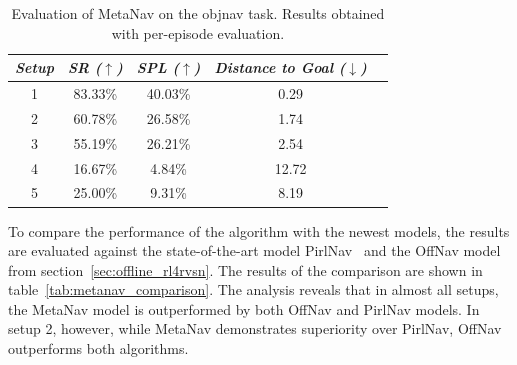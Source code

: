 \begin{table}
    \centering
    \begin{tabular}{c|cccc}
        \toprule
        \textit{\textbf{Setup}} & \textit{\textbf{SR ($\uparrow$)}} & \textbf{\textit{SPL ($\uparrow$)}} & \textit{\textbf{Distance to Goal ($\downarrow$)}} \\ \midrule
        1                       & 83.33\%                           & 40.03\%                            & 0.29                                              \\
        2                       & 60.78\%                           & 26.58\%                            & 1.74                                              \\
        3                       & 55.19\%                           & 26.21\%                            & 2.54                                              \\
        4                       & 16.67\%                           & 4.84\%                             & 12.72                                             \\
        5                       & 25.00\%                           & 9.31\%                             & 8.19                                              \\
    \end{tabular}
    \caption{Evaluation of MetaNav on the \acrshort{objnav} task. Results obtained with per-episode evaluation.}
    \label{tab:metanav_episode}
\end{table}

To compare the performance of the algorithm with the newest models, the results are evaluated against the state-of-the-art model PirlNav~\cite{ramrakhya2023} and the OffNav model from section~\ref{sec:offline_rl4rvsn}.
The results of the comparison are shown in table~\ref{tab:metanav_comparison}.
The analysis reveals that in almost all setups, the MetaNav model is outperformed by both OffNav and PirlNav models.
In setup 2, however, while MetaNav demonstrates superiority over PirlNav, OffNav outperforms both algorithms.

